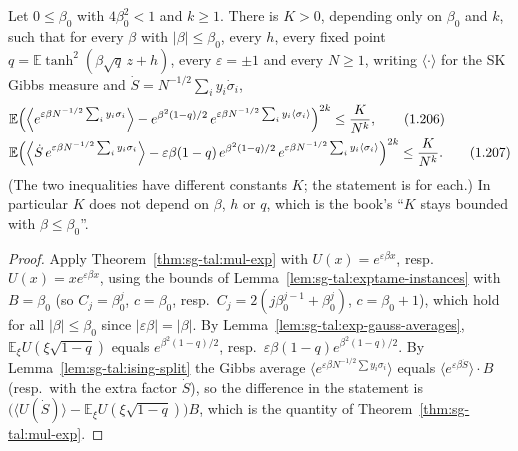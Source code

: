 \begin{theorem}
\label{thm:sg-tal:cor-1713}
  \leanok
{}
Let $0\le\beta_0$ with $4\beta_0^2<1$ and $k\ge1$.  There is $K>0$, depending only on $\beta_0$ and $k$, such that for every $\beta$ with $|\beta|\le\beta_0$, every $h$, every fixed point $q=\mathbb E\tanh^2(\beta\sqrt q\,z+h)$, every $\varepsilon=\pm1$ and every $N\ge1$, writing $\langle\cdot\rangle$ for the SK Gibbs measure and $\dot S=N^{-1/2}\sum_iy_i\dot\sigma_i$,
\begin{align*}
&\mathbb E\Bigl(\Bigl\langle e^{\varepsilon\beta N^{-1/2}\sum_iy_i\sigma_i}\Bigr\rangle-e^{\beta^2(1-q)/2}\,e^{\varepsilon\beta N^{-1/2}\sum_iy_i\langle\sigma_i\rangle}\Bigr)^{2k}\le\frac K{N^k},\tag{1.206}\\
&\mathbb E\Bigl(\Bigl\langle\dot S\,e^{\varepsilon\beta N^{-1/2}\sum_iy_i\sigma_i}\Bigr\rangle-\varepsilon\beta(1-q)\,e^{\beta^2(1-q)/2}\,e^{\varepsilon\beta N^{-1/2}\sum_iy_i\langle\sigma_i\rangle}\Bigr)^{2k}\le\frac K{N^k}.\tag{1.207}
\end{align*}
(The two inequalities have different constants $K$; the statement is for each.)  In particular $K$ does not depend on $\beta$, $h$ or $q$, which is the book's ``$K$ stays bounded with $\beta\le\beta_0$''.
\end{theorem}
\begin{proof}
  \leanok
Apply Theorem~\ref{thm:sg-tal:mul-exp} with $U(x)=e^{\varepsilon\beta x}$, resp.\ $U(x)=xe^{\varepsilon\beta x}$, using the bounds of Lemma~\ref{lem:sg-tal:exptame-instances} with $B=\beta_0$ (so $C_j=\beta_0^j$, $c=\beta_0$, resp.\ $C_j=2(j\beta_0^{j-1}+\beta_0^j)$, $c=\beta_0+1$), which hold for all $|\beta|\le\beta_0$ since $|\varepsilon\beta|=|\beta|$.  By Lemma~\ref{lem:sg-tal:exp-gauss-averages}, $\mathbb E_\xi U(\xi\sqrt{1-q})$ equals $e^{\beta^2(1-q)/2}$, resp.\ $\varepsilon\beta(1-q)e^{\beta^2(1-q)/2}$.
By Lemma~\ref{lem:sg-tal:ising-split} the Gibbs average $\langle e^{\varepsilon\beta N^{-1/2}\sum y_i\sigma_i}\rangle$ equals $\langle e^{\varepsilon\beta\dot S}\rangle\cdot B$ (resp.\ with the extra factor $\dot S$), so the difference in the statement is $\bigl(\langle U(\dot S)\rangle-\mathbb E_\xi U(\xi\sqrt{1-q})\bigr)B$, which is the quantity of Theorem~\ref{thm:sg-tal:mul-exp}.
\end{proof}


